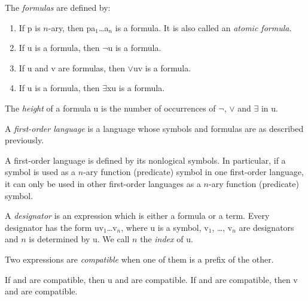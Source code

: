 \begin{definition}
	The \emph{formulas} are defined by:
	\begin{enumerate}
		\item If \synt p is $n$-ary, then \synt p\synt a$_1$\dots\synt a$_n$ is a formula.
		It is also called an \emph{atomic formula}.
		\item If \synt u is a formula, then $\lnot$\synt u is a formula.
		\item If \synt u and \synt v are formulas, then $\lor$\synt u\synt v is a formula.
		\item If \synt u is a formula, then $\exists$\synt x\synt u is a formula.
	\end{enumerate}
\end{definition}

\begin{definition}
	The \emph{height} of a formula \synt u is the number of occurrences of $\lnot$,
	$\lor$ and $\exists$ in \synt u.
\end{definition}

\begin{definition}
	A \emph{first-order language} is a language whose symbols and formulas are as
	described previously.
\end{definition}

\begin{remark}
	A first-order language is defined by its nonlogical symbols. In particular,
	if a symbol is used as a $n$-ary function (predicate) symbol in one 
	first-order language, it can only be used in other first-order languages
	as a $n$-ary function (predicate) symbol.
\end{remark}

\begin{definition}
	A \emph{designator} is an expression which is either a formula or a term.
	Every designator has the form \synt u\synt v$_1$\dots\synt v$_n$, where
	\synt u is a symbol, \synt v$_1$, \dots, \synt v$_n$ are designators and 
	$n$ is determined by \synt u. We call $n$ the \emph{index} of \synt u.
\end{definition}

\begin{definition}
	Two expressions are \emph{compatible} when one of them is a prefix
	of the other.
\end{definition}

\begin{fact}
	If  and  are compatible, then \synt u and  are
	compatible. If  and  are compatible, then \synt v
	and  are compatible.
\end{fact}

